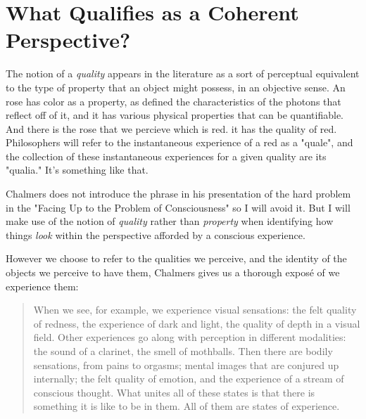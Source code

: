 \documentclass[runningheads]{llncs}
\begin{document}

\section{What Qualifies as a Coherent Perspective?}

The notion of a \emph{quality} appears in the literature as a sort of perceptual equivalent to the type of property that an object might possess, in an objective sense. An rose has color as a property, as defined the characteristics of the photons that reflect off of it, and it has various physical properties that can be quantifiable. And there is the rose that we percieve which is red. it has the quality of red. Philosophers will refer to the instantaneous experience of a red as a "quale", and the collection of these instantaneous experiences for a given quality are its "qualia." It's something like that.  

Chalmers does not introduce the phrase in his presentation of the hard problem in the "Facing Up to the Problem of Consciousness" so I will avoid it. But I will make use of the notion of \emph{quality} rather than \emph{property} when identifying how things \emph{look} within the perspective afforded by a conscious experience. 

However we choose to refer to the qualities we perceive, and the identity of the objects we perceive to have them, Chalmers gives us a thorough exposé of we experience them: 

\begin{quote}
When we see, for example, we experience visual sensations: the felt quality of redness, the experience of dark and light, the quality of depth in a visual field. Other experiences go along with perception in different modalities: the sound of a clarinet, the smell of mothballs. Then there are bodily sensations, from pains to orgasms; mental images that are conjured up internally; the felt quality of emotion, and the experience of a stream of conscious thought. What unites all of these states is that there is something it is like to be in them. All of them are states of experience.
\end{quote}
\end{document}
